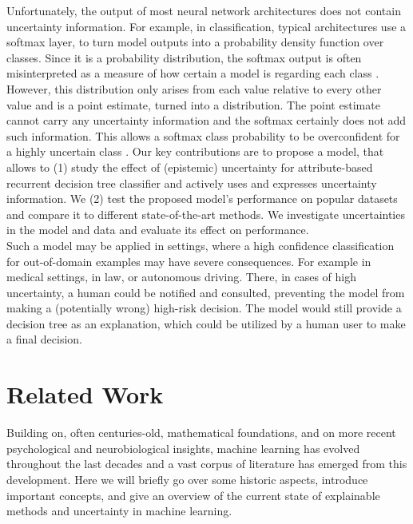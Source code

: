 \documentclass[a4paper,cleardoubleempty,BCOR1cm, 11pt]{report}
\begin{document}
Unfortunately, the output of most neural network architectures does not contain uncertainty information. For example, in classification, typical architectures use a softmax layer, to turn model outputs into a probability density function over classes\cite{nwankpa2018activation}. Since it is a probability distribution, the softmax output is often misinterpreted as a measure of how certain a model is regarding each class \cite{sensoy2018evidential}. However, this distribution only arises from each value relative to every other value and is a point estimate, turned into a distribution. The point estimate cannot carry any uncertainty information and the softmax certainly does not add such information. This allows a softmax class probability to be overconfident for a highly uncertain class \cite{gal2016dropout}.
Our key contributions are to propose a model, that allows to (1) study the effect of (epistemic) uncertainty for attribute-based recurrent decision tree classifier and actively uses and expresses uncertainty information. We (2) test the proposed model's performance on popular datasets and compare it to different state-of-the-art methods. We investigate uncertainties in the model and data and evaluate its effect on performance. \\
Such a model may be applied in settings, where a high confidence classification for out-of-domain examples may have severe consequences. For example in medical settings, in law, or autonomous driving. There, in cases of high uncertainty, a human could be notified and consulted, preventing the model from making a (potentially wrong) high-risk decision. The model would still provide a decision tree as an explanation, which could be utilized by a human user to make a final decision.




\chapter{Related Work}
Building on, often centuries-old, mathematical foundations, and on more recent psychological and neurobiological insights, machine learning has evolved throughout the last decades and a vast corpus of literature has emerged from this development. Here we will briefly go over some historic aspects, introduce important concepts, and give an overview of the current state of explainable methods and uncertainty in machine learning. 
\end{document}
